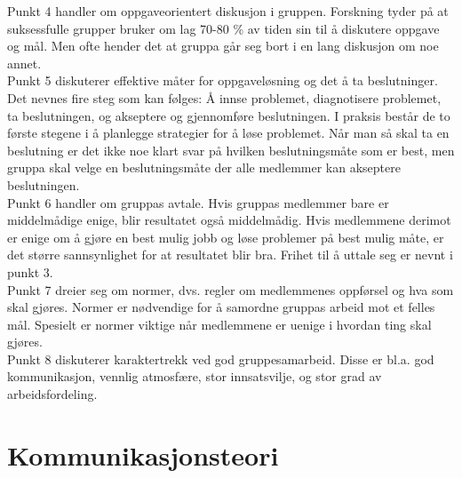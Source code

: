 
Punkt 4 handler om oppgaveorientert diskusjon i gruppen. Forskning tyder på at suksessfulle grupper bruker om lag 70-80 \% av tiden sin til å diskutere oppgave og mål. Men ofte hender det at gruppa går seg bort i en lang diskusjon om noe annet. \\

Punkt 5 diskuterer effektive måter for oppgaveløsning og det å ta beslutninger. Det nevnes fire steg som kan følges: Å innse problemet, diagnotisere problemet, ta beslutningen, og akseptere og gjennomføre beslutningen. I praksis består de to første stegene i å planlegge strategier for å løse problemet. Når man så skal ta en beslutning er det ikke noe klart svar på hvilken beslutningsmåte som er best, men gruppa skal velge en beslutningsmåte der alle medlemmer kan akseptere beslutningen.  \\

Punkt 6 handler om gruppas avtale. Hvis gruppas medlemmer bare er middelmådige enige, blir resultatet også middelmådig. Hvis medlemmene derimot er enige om å gjøre en best mulig jobb og løse problemer på best mulig måte, er det større sannsynlighet for at resultatet blir bra. Frihet til å uttale seg er nevnt i punkt 3. \\

Punkt 7 dreier seg om normer, dvs. regler om medlemmenes oppførsel og hva som skal gjøres. Normer er nødvendige for å samordne gruppas arbeid mot et felles mål. Spesielt er normer viktige når medlemmene er uenige i hvordan ting skal gjøres. \\

Punkt 8 diskuterer karaktertrekk ved god gruppesamarbeid. Disse er bl.a. god kommunikasjon, vennlig atmosfære, stor innsatsvilje, og stor grad av arbeidsfordeling.\\

\section{Kommunikasjonsteori}
\label{sec:kommunikasjonsteori}

